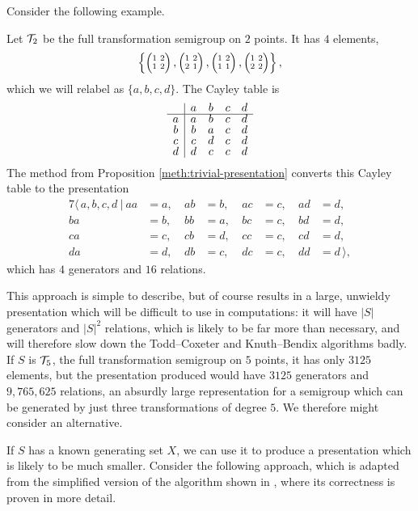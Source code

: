 Consider the following example.

\begin{example}
  Let $\mathcal{T}_2$ be the full transformation semigroup on $2$ points.  It has $4$
  elements,
  $$\left\{\transII 12, \transII 21, \transII 11, \transII 22\right\},$$
  which we will relabel as $\{a,b,c,d\}$.  The Cayley table is
  $$
  \begin{array}{c | c c c c}
    & a & b & c & d \\
    \hline
    a & a & b & c & d \\
    b & b & a & c & d \\
    c & c & d & c & d \\
    d & d & c & c & d \\
  \end{array}
  $$
  The method from Proposition \ref{meth:trivial-presentation} converts this
  Cayley table to the presentation
  \begin{alignat*}{7}
    \langle\, a,b,c,d ~|~
    aa&=a,\ & ab&=b,\ & ac&=c,\ & ad&=d, \\
    ba&=b,\ & bb&=a,\ & bc&=c,\ & bd&=d, \\
    ca&=c,\ & cb&=d,\ & cc&=c,\ & cd&=d, \\
    da&=d,\ & db&=c,\ & dc&=c,\ & dd&=d\,\rangle,
  \end{alignat*}
  which has $4$ generators and $16$ relations.
\end{example}

This approach is simple to describe, but of course results in a large, unwieldy
presentation which will be difficult to use in computations: it will have $|S|$
generators and $|S|^2$ relations, which is likely to be far more than necessary,
and will therefore slow down the Todd--Coxeter and Knuth--Bendix algorithms badly.
If $S$ is $\mathcal{T}_5$, the full transformation semigroup on $5$ points, it has only
$3125$ elements, but the presentation produced would have $3125$ generators and
$9,765,625$ relations, an absurdly large representation for a semigroup which
can be generated by just three transformations of degree $5$.  We
therefore might consider an alternative.


If $S$ has a known generating set $X$, we can use it to produce a presentation
which is likely to be much smaller.  Consider the following approach, which is
adapted from the simplified version of the algorithm shown in
\cite[\S 3.1]{froidure_pin}, where its correctness is proven in more detail.

